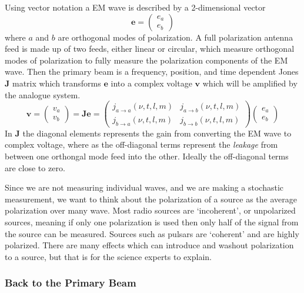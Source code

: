\documentclass[usenatbib,usegraphicx]{article}
\begin{document}
Using vector notation a EM wave is described by a 2-dimensional vector
%
\begin{equation}
\label{eq:em}
\mathbf{e}=
    \begin{pmatrix}
        e_a\\
        e_b
    \end{pmatrix}
\end{equation}
%
where $a$ and $b$ are orthogonal modes of polarization.
A full polarization antenna feed is made up of two feeds, either linear or circular, which measure orthogonal modes of polarization to fully measure the polarization components of the EM wave.
Then the primary beam is a frequency, position, and time dependent Jones $\mathbf{J}$ matrix which transforms $\mathbf{e}$ into a complex voltage $\mathbf{v}$ which will be amplified by the analogue system.
%
\begin{equation}
\label{eq:primary_beam}
\mathbf{v}=
    \begin{pmatrix}
        v_a\\
        v_b
    \end{pmatrix}
=\mathbf{J}\mathbf{e}=
    \begin{pmatrix}
        j_{a \rightarrow a}(\nu,t,l,m) & j_{a \rightarrow b}(\nu,t,l,m)\\
        j_{b \rightarrow a}(\nu,t,l,m) & j_{b \rightarrow b}(\nu,t,l,m)
    \end{pmatrix}
    \begin{pmatrix}
        e_a\\
        e_b
    \end{pmatrix}
\end{equation}
%
In $\mathbf{J}$ the diagonal elements represents the gain from converting the EM wave to complex voltage, where as the off-diagonal terms represent the \emph{leakage} from between one orthongal mode feed into the other. Ideally the off-diagonal terms are close to zero.

Since we are not measuring individual waves, and we are making a stochastic measurement, we want to think about the polarization of a source as the average polarization over many wave.
Most radio sources are `incoherent', or unpolarized sources, meaning if only one polarization is used then only half of the signal from the source can be measured.
Sources such as pulsars are `coherent' and are highly polarized.
There are many effects which can introduce and washout polarization to a source, but that is for the science experts to explain.

\subsubsection{Back to the Primary Beam}
\end{document}
